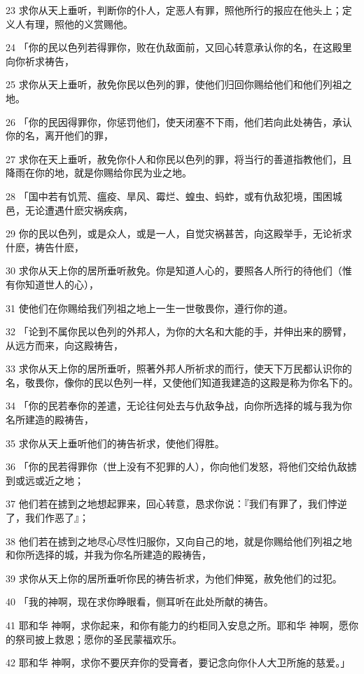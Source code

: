 \par 23 求你从天上垂听，判断你的仆人，定恶人有罪，照他所行的报应在他头上；定义人有理，照他的义赏赐他。
\par 24 「你的民以色列若得罪你，败在仇敌面前，又回心转意承认你的名，在这殿里向你祈求祷告，
\par 25 求你从天上垂听，赦免你民以色列的罪，使他们归回你赐给他们和他们列祖之地。
\par 26 「你的民因得罪你，你惩罚他们，使天闭塞不下雨，他们若向此处祷告，承认你的名，离开他们的罪，
\par 27 求你在天上垂听，赦免你仆人和你民以色列的罪，将当行的善道指教他们，且降雨在你的地，就是你赐给你民为业之地。
\par 28 「国中若有饥荒、瘟疫、旱风、霉烂、蝗虫、蚂蚱，或有仇敌犯境，围困城邑，无论遭遇什麽灾祸疾病，
\par 29 你的民以色列，或是众人，或是一人，自觉灾祸甚苦，向这殿举手，无论祈求什麽，祷告什麽，
\par 30 求你从天上你的居所垂听赦免。你是知道人心的，要照各人所行的待他们（惟有你知道世人的心），
\par 31 使他们在你赐给我们列祖之地上一生一世敬畏你，遵行你的道。
\par 32 「论到不属你民以色列的外邦人，为你的大名和大能的手，并伸出来的膀臂，从远方而来，向这殿祷告，
\par 33 求你从天上你的居所垂听，照著外邦人所祈求的而行，使天下万民都认识你的名，敬畏你，像你的民以色列一样，又使他们知道我建造的这殿是称为你名下的。
\par 34 「你的民若奉你的差遣，无论往何处去与仇敌争战，向你所选择的城与我为你名所建造的殿祷告，
\par 35 求你从天上垂听他们的祷告祈求，使他们得胜。
\par 36 「你的民若得罪你（世上没有不犯罪的人），你向他们发怒，将他们交给仇敌掳到或远或近之地；
\par 37 他们若在掳到之地想起罪来，回心转意，恳求你说：『我们有罪了，我们悖逆了，我们作恶了』；
\par 38 他们若在掳到之地尽心尽性归服你，又向自己的地，就是你赐给他们列祖之地和你所选择的城，并我为你名所建造的殿祷告，
\par 39 求你从天上你的居所垂听你民的祷告祈求，为他们伸冤，赦免他们的过犯。
\par 40 「我的神啊，现在求你睁眼看，侧耳听在此处所献的祷告。
\par 41 耶和华 神啊，求你起来，和你有能力的约柜同入安息之所。耶和华 神啊，愿你的祭司披上救恩；愿你的圣民蒙福欢乐。
\par 42 耶和华 神啊，求你不要厌弃你的受膏者，要记念向你仆人大卫所施的慈爱。」

